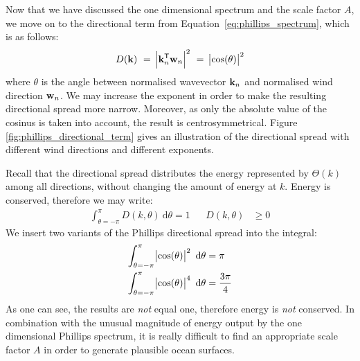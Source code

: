 %

Now that we have discussed the one dimensional \wavenumber spectrum and the 
scale factor $A$, we move on to the directional term from 
Equation~\ref{eq:phillips_spectrum}, which is as follows:
\begin{equation*}
 D(\mathbf{k})~=~\abs{\mathbf{k}_n^{\mathsf{T}}\mathbf{w}_n}^2~=~\abs{\cos(\theta)}^2
\end{equation*}
where $\theta$ is the angle between normalised wavevector $\mathbf{k}_n$ and
normalised wind direction $\mathbf{w}_n$.
We may increase the exponent in 
order to make the resulting directional spread more narrow. Moreover, as only
the  absolute value of the cosinus is taken into account, the result is
centrosymmetrical. Figure \ref{fig:phillips_directional_term} gives an
illustration of the directional spread with different wind directions and
different exponents.

Recall that the directional spread distributes the energy represented by
$\Theta(k)$ among all directions, without changing the amount of energy at
\wavenumber $k$. Energy is conserved, therefore we may write:
\begin{align*}
\int_{\theta=-\pi}^{\pi}D(k,\theta)~\mathrm{d}\theta = 1 && D(k,\theta) &\geq 0
\end{align*}
We insert two variants of the Phillips directional spread into the integral:
\begin{align*}
\int_{\theta=-\pi}^{\pi} \abs{\cos(\theta)}^2~\mathrm{d}\theta &= \pi \\
\int_{\theta=-\pi}^{\pi} \abs{\cos(\theta)}^4~\mathrm{d}\theta &= \frac{3\pi}{4}
\end{align*}
As one can see, the results are \emph{not} equal one, therefore energy is 
\emph{not} conserved. In combination with the unusual magnitude of energy 
output by the one dimensional Phillips \wavenumber spectrum, it is really 
difficult to find an appropriate scale factor $A$ in order to generate 
plausible ocean surfaces.
%
